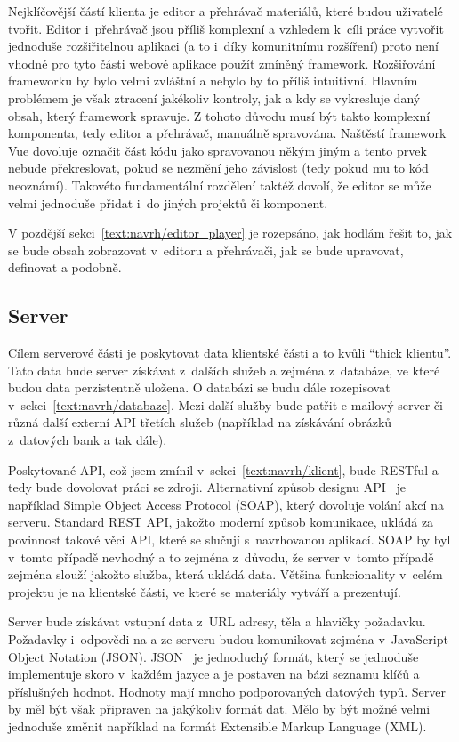 Nejklíčovější částí klienta je editor a přehrávač materiálů, které budou uživatelé tvořit.
Editor i~přehrávač jsou příliš komplexní a vzhledem k~cíli práce vytvořit jednoduše rozšiřitelnou aplikaci (a to i~díky komunitnímu rozšíření) proto není vhodné pro tyto části webové aplikace použít zmíněný framework.
Rozšiřování frameworku by bylo velmi zvláštní a nebylo by to příliš intuitivní.
Hlavním problémem je však ztracení jakékoliv kontroly, jak a kdy se vykresluje daný obsah, který framework spravuje.
Z tohoto důvodu musí být takto komplexní komponenta, tedy editor a přehrávač, manuálně spravována.
Naštěstí framework Vue dovoluje označit část kódu jako spravovanou někým jiným a tento prvek nebude překreslovat, pokud se nezmění jeho závislost (tedy pokud mu to kód neoznámí). 
Takovéto fundamentální rozdělení taktéž dovolí, že editor se může velmi jednoduše přidat i~do jiných projektů či komponent.

V pozdější sekci~\ref{text:navrh/editor_player} je rozepsáno, jak hodlám řešit to, jak se bude obsah zobrazovat v~editoru a přehrávači, jak se bude upravovat, definovat a podobně.

\subsection{Server}\label{text:navrh/server}

Cílem serverové části je poskytovat data klientské části a to kvůli \enquote{thick klientu}. 
Tato data bude server získávat z~dalších služeb a zejména z~databáze, ve které budou data perzistentně uložena.
O databázi se budu dále rozepisovat v~sekci~\ref{text:navrh/databaze}.
Mezi další služby bude patřit e-mailový server či různá další externí API třetích služeb (například na získávání obrázků z~datových bank a tak dále).

Poskytované API, což jsem zmínil v~sekci~\ref{text:navrh/klient}, bude RESTful a tedy bude dovolovat práci se zdroji. 
Alternativní způsob designu API~\cite{richardson_2013} je například Simple Object Access Protocol (SOAP), který dovoluje volání akcí na serveru.
Standard REST API, jakožto moderní způsob komunikace, ukládá za povinnost takové věci API, které se slučují s~navrhovanou aplikací.
SOAP by byl v~tomto případě nevhodný a to zejména z~důvodu, že server v~tomto případě zejména slouží jakožto služba, která ukládá data.
Většina funkcionality v~celém projektu je na klientské části, ve které se materiály vytváří a prezentují.

Server bude získávat vstupní data z~URL adresy, těla a hlavičky požadavku.
Požadavky i~odpovědi na a ze serveru budou komunikovat zejména v~JavaScript Object Notation (JSON).
JSON~\cite{richardson_2013, uzayr2022frontend} je jednoduchý formát, který se jednoduše implementuje skoro v~každém jazyce a je postaven na bázi seznamu klíčů a příslušných hodnot.
Hodnoty mají mnoho podporovaných datových typů.
Server by měl být však připraven na jakýkoliv formát dat.
Mělo by být možné velmi jednoduše změnit například na formát Extensible Markup Language (XML).

